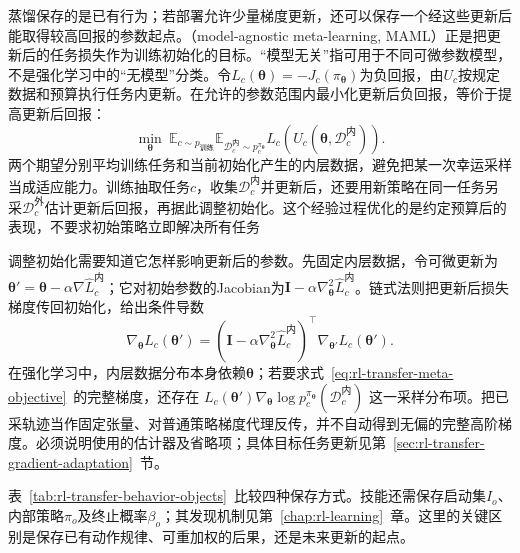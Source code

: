 蒸馏保存的是已有行为；若部署允许少量梯度更新，还可以保存一个经这些更新后能取得较高回报的参数起点。（model-agnostic meta-learning, MAML）正是把更新后的任务损失作为训练初始化的目标。“模型无关”指可用于不同可微参数模型，不是强化学习中的“无模型”分类。令$L_c(\bm\theta)=-J_c(\pi_{\bm\theta})$为负回报，由$U_c$按规定数据和预算执行任务内更新。在允许的参数范围内最小化更新后负回报，等价于提高更新后回报：
\begin{equation}
 \min_{\bm\theta}\ %
 \mathbb E_{c\sim p_{\text{训练}}}
 \mathbb E_{\mathcal D_c^{\text{内}}\sim p_c^{\pi_{\bm\theta}}}
 L_c\!\left(U_c(\bm\theta,\mathcal D_c^{\text{内}})\right).
 \label{eq:rl-transfer-meta-objective}
\end{equation}
两个期望分别平均训练任务和当前初始化产生的内层数据，避免把某一次幸运采样当成适应能力。训练抽取任务$c$，收集$\mathcal D_c^{\text{内}}$并更新后，还要用新策略在同一任务另采$\mathcal D_c^{\text{外}}$估计更新后回报，再据此调整初始化。这个经验过程优化的是约定预算后的表现，不要求初始策略立即解决所有任务

调整初始化需要知道它怎样影响更新后的参数。先固定内层数据，令可微更新为$\bm\theta'=\bm\theta-\alpha\nabla\widehat L_c^{\text{内}}$；它对初始参数的Jacobian为$\bm I-\alpha\nabla_{\bm\theta}^2\widehat L_c^{\text{内}}$。链式法则把更新后损失梯度传回初始化，给出条件导数
\[
 \nabla_{\bm\theta}L_c(\bm\theta')
 =\left(\bm I-\alpha\nabla_{\bm\theta}^2\widehat L_c^{\text{内}}\right)^\top
       \nabla_{\bm\theta'}L_c(\bm\theta').
\]
在强化学习中，内层数据分布本身依赖$\bm\theta$；若要求式~\eqref{eq:rl-transfer-meta-objective}~的完整梯度，还存在
$L_c(\bm\theta')\nabla_{\bm\theta}\log p_c^{\pi_{\bm\theta}}(\mathcal D_c^{\text{内}})$
这一采样分布项。把已采轨迹当作固定张量、对普通策略梯度代理反传，并不自动得到无偏的完整高阶梯度。必须说明使用的估计器及省略项；具体目标任务更新见第~\ref{sec:rl-transfer-gradient-adaptation}~节。

表~\ref{tab:rl-transfer-behavior-objects}~比较四种保存方式。技能还需保存启动集$I_o$、内部策略$\pi_o$及终止概率$\beta_o$；其发现机制见第~\ref{chap:rl-learning}~章。这里的关键区别是保存已有动作规律、可重加权的后果，还是未来更新的起点。


